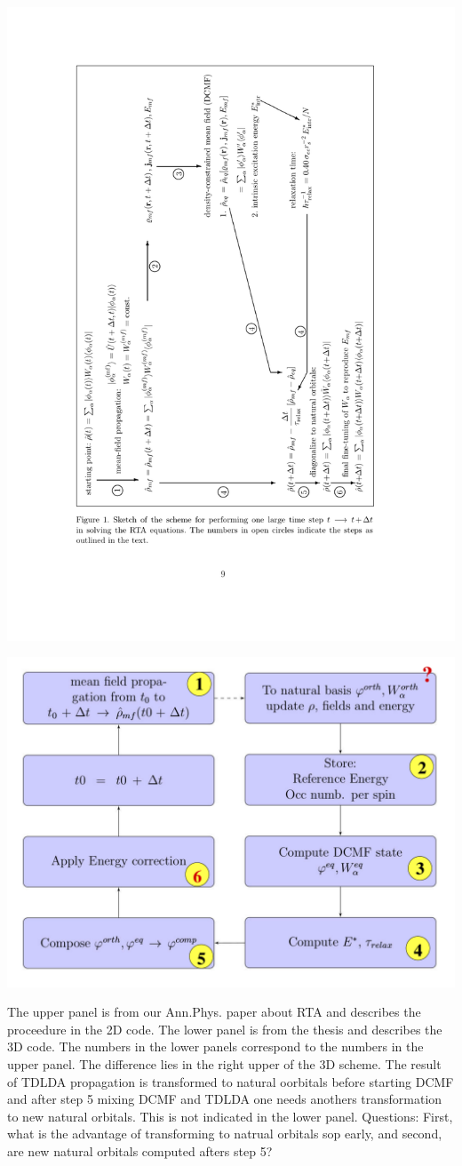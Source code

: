 \documentclass[11pt]{article}
\begin{document}
			

\centerline{\includegraphics[height=0.9\linewidth,angle=-90]{RTA-scheme1.pdf}}


\centerline{\includegraphics[width=0.8\linewidth]{RTA-scheme2b.pdf}}


The upper panel is from our Ann.Phys. paper about RTA and describes
the proceedure in the 2D code. The lower panel is from the thesis and
describes the 3D code. The numbers in the lower panels correspond to
the numbers in the upper panel.
The difference lies in the right upper of the
3D scheme. The result of TDLDA propagation is transformed to natural
oorbitals before starting DCMF and after step 5 mixing DCMF and TDLDA
one needs anothers transformation to new natural orbitals. This is not
indicated in the lower panel. Questions: First, what is the advantage of
transforming to natrual orbitals sop early, and second, are new
natural orbitals computed afters step 5?

	
\end{document}
